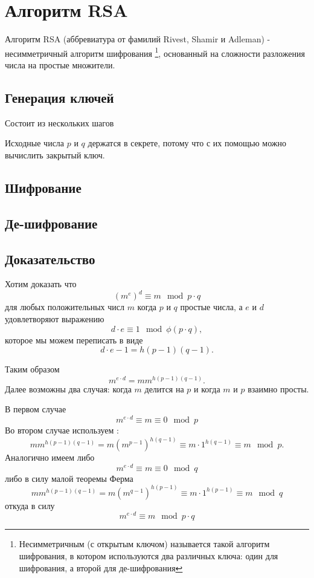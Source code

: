 \section{Алгоритм RSA}
\label{AddRSA}
Алгоритм RSA (аббревиатура от фамилий Rivest, Shamir и Adleman) - 
несимметричный алгоритм шифрования
\footnote{Несимметричным (с открытым ключом) называется такой алгоритм
  шифрования, в 
  котором используются два различных ключа: один для шифрования, а
  второй для де-шифрования},  
основанный на сложности разложения числа на простые множители.  

\subsection{Генерация ключей}
Состоит из нескольких шагов


Исходные числа $p$ и $q$ держатся в секрете, потому что с их помощью
можно вычислить закрытый ключ.



\subsection{Шифрование}


\subsection{Де-шифрование}


\subsection{Доказательство}
Хотим доказать что 
\[
\left(m^e\right)^d \equiv m \mod{p \cdot q}
\]
для любых положительных числ $m$ когда $p$ и $q$ простые числа, а $e$
и $d$ удовлетворяют выражению
\[
d \cdot e \equiv 1 \mod{\phi\left(p \cdot q\right)},
\]
которое мы можем переписать в виде
\[
d \cdot e - 1 = h \left(p - 1\right)\left(q - 1\right).
\]

Таким образом
\[
m^{e\cdot d} =m m^{h \left(p - 1\right)\left(q - 1\right)}.
\]
Далее возможны два случая: когда $m$ делится на $p$ и когда $m$ и $p$
взаимно просты.

В первом случае 
\[
m^{e\cdot d} \equiv m \equiv 0 \mod{p}
\]
Во втором случае используем
:
\[
m m^{h \left(p - 1\right)\left(q - 1\right)} 
= m \left(m^{p - 1}\right)^{h \left(q - 1\right)} \equiv m \cdot 1^{h
  \left(q - 1\right)} \equiv m \mod{p}.
\]
Аналогично имеем либо
\[
m^{e\cdot d} \equiv m \equiv 0 \mod{q}
\]
либо в силу малой теоремы Ферма
\[
m m^{h \left(p - 1\right)\left(q - 1\right)} 
= m \left(m^{q - 1}\right)^{h \left(p - 1\right)} \equiv m \cdot 1^{h
  \left(p - 1\right)} \equiv m \mod{q}
\]
откуда в силу 
\[
m^{e\cdot d} \equiv m \mod{p \cdot q}
\]

